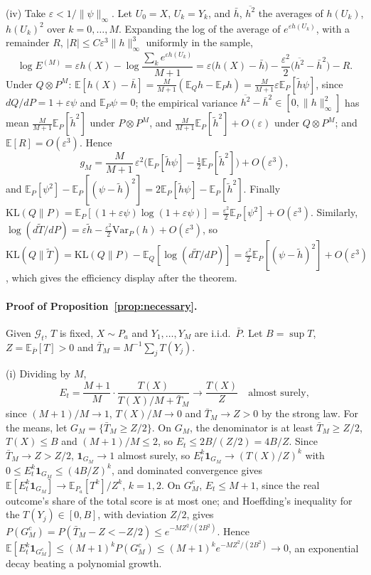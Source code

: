 \documentclass[12pt]{article}
\newcommand{\E}{\mathbb{E}}
\newcommand{\KL}{\mathrm{KL}}
\newcommand{\G}{\mathcal{G}}
\theoremstyle{remark}
\begin{document}
(iv) Take $\varepsilon < 1/\|\psi\|_\infty$. Let $U_0 = X$, $U_k = Y_k$, and
$\bar h$, $\overline{h^2}$ the averages of $h(U_k)$, $h(U_k)^2$ over
$k = 0, \ldots, M$. Expanding the log of the average of $e^{\varepsilon h(U_k)}$,
with a remainder $R$, $|R| \le C\varepsilon^3\|h\|_\infty^3$ uniformly in the sample,
\[
\log E^{(M)} = \varepsilon h(X) - \log\frac{\sum_k e^{\varepsilon h(U_k)}}{M+1}
= \varepsilon\big(h(X) - \bar h\big) - \frac{\varepsilon^2}{2}\big(\overline{h^2} - \bar h^2\big) - R .
\]
Under $Q \otimes P^M$: $\E[h(X) - \bar h] = \frac{M}{M+1}(\E_Q h - \E_P h)
= \frac{M}{M+1}\varepsilon\E_P[\tilde h\psi]$, since $dQ/dP = 1+\varepsilon\psi$
and $\E_P\psi = 0$; the empirical variance $\overline{h^2} - \bar h^2 \in [0, \|h\|_\infty^2]$
has mean $\frac{M}{M+1}\E_P[\tilde h^2]$ under $P \otimes P^M$, and
$\frac{M}{M+1}\E_P[\tilde h^2] + O(\varepsilon)$ under $Q \otimes P^M$; and
$\E[R] = O(\varepsilon^3)$. Hence
\[
g_M = \frac{M}{M+1}\,\varepsilon^2\Big(\E_P[\tilde h\psi] - \tfrac12\E_P[\tilde h^2]\Big) + O(\varepsilon^3),
\]
and $\E_P[\psi^2] - \E_P[(\psi - \tilde h)^2] = 2\E_P[\tilde h\psi] - \E_P[\tilde h^2]$.
Finally $\KL(Q\|P) = \E_P[(1 + \varepsilon\psi)\log(1 + \varepsilon\psi)]
= \frac{\varepsilon^2}{2}\E_P[\psi^2] + O(\varepsilon^3)$. Similarly,
$\log(d\tilde T/dP) = \varepsilon\tilde h - \frac{\varepsilon^2}{2}\mathrm{Var}_P(h)
+ O(\varepsilon^3)$, so
$\KL(Q\|\tilde T) = \KL(Q\|P) - \E_Q[\log(d\tilde T/dP)]
= \frac{\varepsilon^2}{2}\E_P[(\psi - \tilde h)^2] + O(\varepsilon^3)$, which
gives the efficiency display after the theorem.

\paragraph{Proof of Proposition~\ref{prop:necessary}.}
Given $\G_t$, $T$ is fixed, $X \sim P_a$ and $Y_1, \ldots, Y_M$ are i.i.d.\
$\bar P$. Let $B = \sup T$, $Z = \E_{\bar P}[T] > 0$ and
$\bar T_M = M^{-1}\sum_j T(Y_j)$.

(i) Dividing by $M$,
\[
E_t = \frac{M+1}{M}\cdot\frac{T(X)}{T(X)/M + \bar T_M} \to \frac{T(X)}{Z}
\quad\text{almost surely},
\]
since $(M+1)/M \to 1$, $T(X)/M \to 0$ and $\bar T_M \to Z > 0$ by the strong law.
For the means, let $G_M = \{\bar T_M \ge Z/2\}$. On $G_M$, the denominator is at
least $\bar T_M \ge Z/2$, $T(X) \le B$ and $(M+1)/M \le 2$, so
$E_t \le 2B/(Z/2) = 4B/Z$. Since $\bar T_M \to Z > Z/2$,
$\mathbf 1_{G_M} \to 1$ almost surely, so $E_t^k\mathbf 1_{G_M} \to (T(X)/Z)^k$
with $0 \le E_t^k\mathbf 1_{G_M} \le (4B/Z)^k$, and dominated convergence gives
$\E[E_t^k\mathbf 1_{G_M}] \to \E_{P_a}[T^k]/Z^k$, $k = 1, 2$. On $G_M^c$, $E_t \le M+1$, since the real outcome's
share of the total score is at most one; and Hoeffding's inequality
\citep{hoeffding1963probability} for the $T(Y_j) \in [0, B]$, with deviation
$Z/2$, gives $P(G_M^c) = P(\bar T_M - Z < -Z/2) \le e^{-MZ^2/(2B^2)}$. Hence
$\E[E_t^k\mathbf 1_{G_M^c}] \le (M+1)^k P(G_M^c) \le (M+1)^k e^{-MZ^2/(2B^2)} \to 0$,
an exponential decay beating a polynomial growth.
\end{document}
